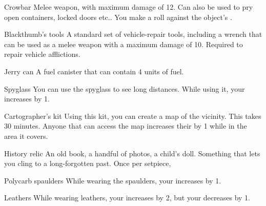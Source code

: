 \hr

\begin{describe}{Crowbar}
  Melee weapon, with maximum damage of 12. Can also be used to pry open containers, locked doors etc.. You make a  roll against the object's .
\end{describe}

\begin{describe}{Blackthumb's tools}
  A standard set of vehicle-repair tools, including a wrench that can be used as a melee weapon with a maximum damage of 10. Required to repair vehicle afflictions.
\end{describe}

\begin{describe}{Jerry can}
  A fuel canister that can contain 4 units of fuel.
\end{describe}

\begin{describe}{Spyglass}
  You can use the spyglass to see long distances. While using it, your  increases by 1.
\end{describe}

\begin{describe}{Cartographer's kit}
  Using this kit, you can create a map of the vicinity. This takes 30 minutes. Anyone that can access the map increases their  by 1 while in the area it covers.
\end{describe}

\begin{describe}{History relic}
  An old book, a handful of photos, a child's doll. Something that lets you cling to a long-forgotten past. Once per setpiece, 
\end{describe}

\hr

\begin{describe}{Polycarb spaulders}
  While wearing the spaulders, your  increases by 1.
\end{describe}

\begin{describe}{Leathers}
  While wearing leathers, your  increases by 2, but your  decreases by 1.
\end{describe}

